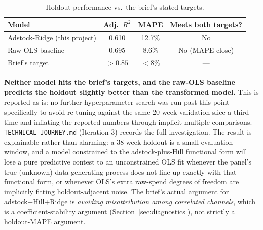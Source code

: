 \documentclass[11pt]{report}
\begin{document}
\begin{table}[htbp]\centering
\begin{tabular}{lccc}
\toprule
Model & Adj.\ $R^2$ & MAPE & Meets both targets? \\
\midrule
Adstock-Ridge (this project) & 0.610 & 12.7\% & No \\
Raw-OLS baseline             & 0.695 & 8.6\%  & No (MAPE close) \\
\midrule
Brief's target & $>0.85$ & $<8\%$ & --- \\
\bottomrule
\end{tabular}
\caption{Holdout performance vs.\ the brief's stated targets.}
\label{tab:holdout}
\end{table}

\textbf{Neither model hits the brief's targets, and the raw-OLS baseline predicts the
holdout slightly better than the transformed model.} This is reported as-is: no further
hyperparameter search was run past this point specifically to avoid re-tuning against the
same 20-week validation slice a third time and inflating the reported numbers through
implicit multiple comparisons. \texttt{TECHNICAL\_JOURNEY.md} (Iteration 3) records the
full investigation. The result is explainable rather than alarming: a 38-week holdout is a
small evaluation window, and a model constrained to the adstock-plus-Hill functional form
will lose a pure predictive contest to an unconstrained OLS fit whenever the panel's true
(unknown) data-generating process does not line up exactly with that functional form, or
whenever OLS's extra raw-spend degrees of freedom are implicitly fitting
holdout-adjacent noise. The brief's actual argument for adstock+Hill+Ridge is
\emph{avoiding misattribution among correlated channels}, which is a coefficient-stability
argument (Section~\ref{sec:diagnostics}), not strictly a holdout-MAPE argument.
\end{document}
